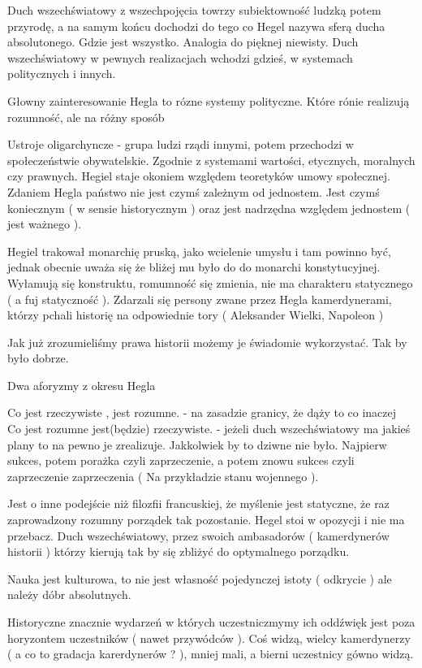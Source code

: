\documentclass[11pt]{article}
\begin{document}
Duch wszechświatowy z wszechpojęcia towrzy subiektowność ludzką potem przyrodę, a na samym końcu dochodzi do tego co Hegel nazywa sferą ducha absolutonego. Gdzie jest wszystko.
Analogia do pięknej niewisty. Duch wszechświatowy w pewnych realizacjach wchodzi gdzieś, w systemach politycznych i innych. 

Głowny zainteresowanie Hegla to rózne systemy polityczne. Które rónie realizują rozumność, ale  na różny sposób

Ustroje oligarchyncze - grupa ludzi rządi innymi, potem przechodzi w społeczeństwie obywatelskie. Zgodnie z systemami wartości, etycznych, moralnych czy prawnych. Hegiel staje okoniem względem teoretyków umowy społecznej. Zdaniem Hegla państwo nie jest czymś zależnym od jednostem. Jest czymś koniecznym ( w sensie historycznym ) oraz jest nadrzędna względem jednostem ( jest ważnego ). 

Hegiel trakował monarchię pruską, jako wcielenie umysłu i tam powinno być, jednak obecnie uważa się że bliżej mu było do do monarchi konstytucyjnej. Wyłamują się konstruktu, romumność się zmienia, nie ma charakteru statycznego ( a fuj statyczność ). Zdarzali się persony zwane przez Hegla kamerdynerami, którzy pchali historię na odpowiednie tory ( Aleksander Wielki, Napoleon )

Jak już zrozumieliśmy prawa historii możemy je świadomie wykorzystać. Tak by było dobrze.

Dwa aforyzmy z okresu Hegla

\bigskip
Co jest rzeczywiste , jest rozumne. - na zasadzie granicy, że dąży to co inaczej\\


Co jest rozumne jest(będzie) rzeczywiste. - jeżeli duch wszechświatowy ma jakieś plany to na pewno je zrealizuje. Jakkolwiek by to dziwne nie było. Najpierw sukces, potem porażka czyli zaprzeczenie, a potem znowu sukces czyli zaprzeczenie zaprzeczenia ( Na przykładzie stanu wojennego ). 

Jest o inne podejście niż filozfii francuskiej, że myślenie jest statyczne, że raz zaprowadzony rozumny porządek tak pozostanie. Hegel stoi w opozycji i nie ma przebacz. Duch wszechświatowy, przez swoich ambasadorów ( kamerdynerów historii )  którzy kierują tak by się zbliżyć do optymalnego porządku.

Nauka jest kulturowa, to nie jest własność pojedynczej istoty ( odkrycie ) ale należy dóbr absolutnych.

Historyczne znacznie wydarzeń w których uczestniczmymy ich oddźwięk jest poza horyzontem uczestników ( nawet przywódców ). Coś widzą, wielcy kamerdynerzy ( a co to gradacja karerdynerów ? ), mniej mali, a bierni uczestnicy gówno widzą.
\end{document}
